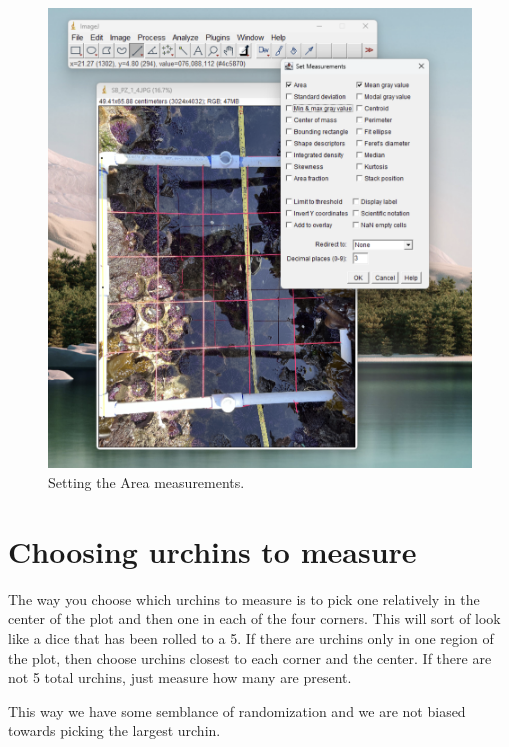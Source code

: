 \documentclass[12pt,letterpaper]{article}
\begin{document}
\begin{figure}[H]
	\centering
	\includegraphics[width=1\linewidth]{figs/SetArea.png}
	\caption{Setting the Area measurements.}
	\label{fig:logo}
\end{figure}


\section{Choosing urchins to measure}

The way you choose which urchins to measure is to pick one relatively in the center of the plot and then one in each of the four corners. This will sort of look like a dice that has been rolled to a 5. If there are urchins only in one region of the plot, then choose urchins closest to each corner and the center. If there are not 5 total urchins, just measure how many are present.  

This way we have some semblance of randomization and we are not biased towards picking the largest urchin.   
\end{document}
